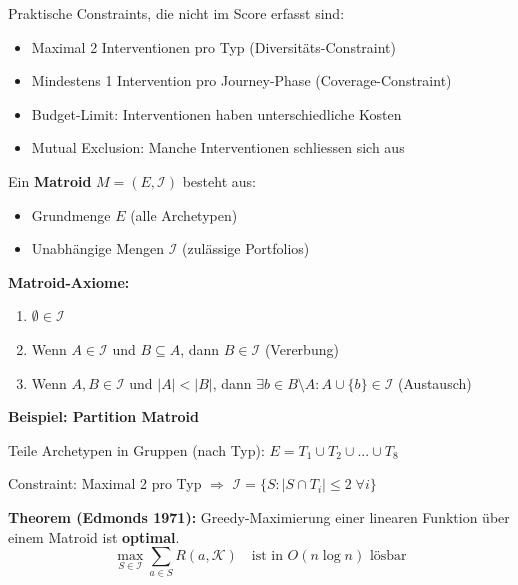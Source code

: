\begin{tcolorbox}[colback=gray!5!white, colframe=gray!75!black,
    title=\textbf{Problem: Harte Constraints bei der Selektion}]

Praktische Constraints, die nicht im Score erfasst sind:

\begin{itemize}[nosep]
    \item Maximal 2 Interventionen pro Typ (Diversitäts-Constraint)
    \item Mindestens 1 Intervention pro Journey-Phase (Coverage-Constraint)
    \item Budget-Limit: Interventionen haben unterschiedliche Kosten
    \item Mutual Exclusion: Manche Interventionen schliessen sich aus
\end{itemize}

\end{tcolorbox}

\begin{tcolorbox}[colback=green!5!white, colframe=green!75!black,
    title=\textbf{Matroid-Formulierung}]

Ein \textbf{Matroid} $M = (E, \mathcal{I})$ besteht aus:
\begin{itemize}[nosep]
    \item Grundmenge $E$ (alle Archetypen)
    \item Unabhängige Mengen $\mathcal{I}$ (zulässige Portfolios)
\end{itemize}

\textbf{Matroid-Axiome:}
\begin{enumerate}[nosep]
    \item $\emptyset \in \mathcal{I}$
    \item Wenn $A \in \mathcal{I}$ und $B \subseteq A$, dann $B \in \mathcal{I}$ (Vererbung)
    \item Wenn $A, B \in \mathcal{I}$ und $|A| < |B|$, dann $\exists b \in B \setminus A: A \cup \{b\} \in \mathcal{I}$ (Austausch)
\end{enumerate}

\textbf{Beispiel: Partition Matroid}

Teile Archetypen in Gruppen (nach Typ): $E = T_1 \cup T_2 \cup ... \cup T_8$

Constraint: Maximal 2 pro Typ $\Rightarrow$ $\mathcal{I} = \{S : |S \cap T_i| \leq 2 \; \forall i\}$

\textbf{Theorem (Edmonds 1971):} Greedy-Maximierung einer linearen Funktion über einem Matroid ist \textbf{optimal}.
\begin{equation}
\max_{S \in \mathcal{I}} \sum_{a \in S} R(a, \mathcal{K}) \quad \text{ist in } O(n \log n) \text{ lösbar}
\end{equation}

\end{tcolorbox}

